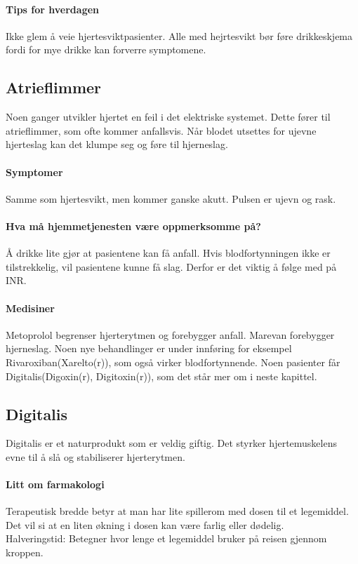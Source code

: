 				\paragraph{Tips for hverdagen\\}
					Ikke glem å veie hjertesviktpasienter. Alle med hejrtesvikt bør føre drikkeskjema fordi for mye drikke kan forverre symptomene. 
			\subsection{Atrieflimmer}
				Noen ganger utvikler hjertet en feil i det elektriske systemet. Dette fører til atrieflimmer, som ofte kommer anfallsvis. Når blodet utsettes for ujevne hjerteslag kan det klumpe seg og føre til hjerneslag.
				\paragraph{Symptomer\\}
					Samme som hjertesvikt, men kommer ganske akutt. Pulsen er ujevn og rask. 
				\paragraph{Hva må hjemmetjenesten være oppmerksomme på?\\}
					Å drikke lite gjør at pasientene kan få anfall. Hvis blodfortynningen ikke er tilstrekkelig, vil pasientene kunne få slag. Derfor er det viktig å følge med på INR. 
				\paragraph{Medisiner\\}
					Metoprolol begrenser hjerterytmen og forebygger anfall. Marevan forebygger hjerneslag. Noen nye behandlinger er under innføring for eksempel Rivaroxiban(Xarelto(r)), som også virker blodfortynnende. Noen pasienter får Digitalis(Digoxin(r), Digitoxin(r)), som det står mer om i neste kapittel.
			\subsection{Digitalis}
				Digitalis er et naturprodukt som er veldig giftig. Det styrker hjertemuskelens evne til å slå og stabiliserer hjerterytmen.
				\paragraph{Litt om farmakologi\\}
					Terapeutisk bredde betyr at man har lite spillerom med dosen til et legemiddel. Det vil si at en liten økning i dosen kan være farlig eller dødelig. \\
					Halveringstid: Betegner hvor lenge et legemiddel bruker på reisen gjennom kroppen.\\
